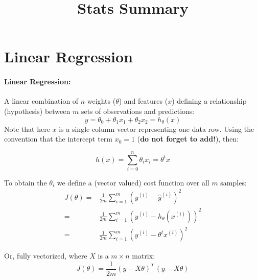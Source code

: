 \documentclass[12pt]{article}
\title{Stats Summary}
\date{}                                           %
\begin{document}
\maketitle


\newcommand{\y}{\mathbf{y}}
\newcommand{\X}{\mathrm{\mathbf{X}}}
\newcommand{\bta}{{\pmb{\beta} } }
\newcommand{\PP}{{\mathrm{\mathbf{P} } } }





\section{Linear Regression}

\paragraph{Linear Regression:} 
A linear combination of $n$ weights ($\theta$) and features ($x$) defining a relationship (hypothesis) between $m$ sets of observations and predictions:
\[
y = \theta_0 + \theta_1 x_1 + \theta_2 x_2 = h_\theta(x)
\]
Note that here $x$ is a single column vector representing one data row. Using the convention that the intercept term $x_0 = 1$ (\textbf{do not forget to add!}), then:

\[
h(x) = \sum_{i=0}^n \theta_i x_i = {\theta}^t  x
\]



To obtain the $\theta_i$ we define a (vector valued) cost function over all $m$ samples:
\begin{align*}
J(\theta) 
=& \frac{1}{2m}\sum_{i=1}^{m} (y^{(i)} - \hat y^{(i)} )^2\\
=& \frac{1}{2m}\sum_{i=1}^{m} (y^{(i)} - h_\theta(x^{(i)}))^2\\
=& \frac{1}{2m}\sum_{i=1}^{m} (y^{(i)} - \theta^t x^{(i)})^2
\end{align*}

Or, fully vectorized, where $X$ is a $m \times n$ matrix:
\[
J(\theta) = \frac{1}{2m} (y - X\theta)^T \, (y - X\theta)
\]
\end{document}

